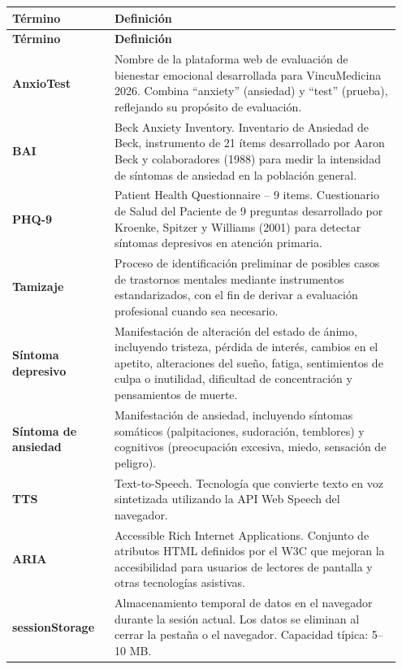 \begin{longtable}{p{0.25\linewidth} p{0.70\linewidth}}
\toprule
\rowcolor{tableheader!20}
\textbf{Término} & \textbf{Definición} \\
\midrule
\endfirsthead
\rowcolor{tableheader!20}
\textbf{Término} & \textbf{Definición} \\
\midrule
\endhead
\bottomrule
\endfoot
\textbf{AnxioTest}
  & Nombre de la plataforma web de evaluación de bienestar emocional desarrollada para VincuMedicina 2026. Combina ``anxiety'' (ansiedad) y ``test'' (prueba), reflejando su propósito de evaluación. \\
\textbf{BAI}
  & Beck Anxiety Inventory. Inventario de Ansiedad de Beck, instrumento de 21 ítems desarrollado por Aaron Beck y colaboradores (1988) para medir la intensidad de síntomas de ansiedad en la población general. \\
\textbf{PHQ-9}
  & Patient Health Questionnaire -- 9 items. Cuestionario de Salud del Paciente de 9 preguntas desarrollado por Kroenke, Spitzer y Williams (2001) para detectar síntomas depresivos en atención primaria. \\
\textbf{Tamizaje}
  & Proceso de identificación preliminar de posibles casos de trastornos mentales mediante instrumentos estandarizados, con el fin de derivar a evaluación profesional cuando sea necesario. \\
\textbf{Síntoma depresivo}
  & Manifestación de alteración del estado de ánimo, incluyendo tristeza, pérdida de interés, cambios en el apetito, alteraciones del sueño, fatiga, sentimientos de culpa o inutilidad, dificultad de concentración y pensamientos de muerte. \\
\textbf{Síntoma de ansiedad}
  & Manifestación de ansiedad, incluyendo síntomas somáticos (palpitaciones, sudoración, temblores) y cognitivos (preocupación excesiva, miedo, sensación de peligro). \\
\textbf{TTS}
  & Text-to-Speech. Tecnología que convierte texto en voz sintetizada utilizando la API Web Speech del navegador. \\
\textbf{ARIA}
  & Accessible Rich Internet Applications. Conjunto de atributos HTML definidos por el W3C que mejoran la accesibilidad para usuarios de lectores de pantalla y otras tecnologías asistivas. \\
\textbf{sessionStorage}
  & Almacenamiento temporal de datos en el navegador durante la sesión actual. Los datos se eliminan al cerrar la pestaña o el navegador. Capacidad típica: 5--10 MB. \\

\end{longtable}

